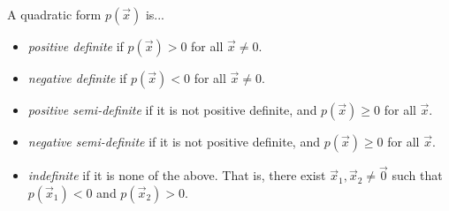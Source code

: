 \documentclass{ximera}
\begin{document}
\begin{definition}
A quadratic form $p(\vec{x})$ is...
\begin{itemize}
\item \emph{positive definite} if $p(\vec{x})>0$ for all $\vec{x}\neq 0$.

\item \emph{negative definite} if $p(\vec{x})<0$ for all $\vec{x}\neq 0$.

\item \emph{positive semi-definite} if it is not positive definite, and $p(\vec{x})\geq 0$ for all $\vec{x}$.

\item \emph{negative semi-definite} if it is not positive definite, and $p(\vec{x})\geq 0$ for all $\vec{x}$.

\item \emph{indefinite} if it is none of the above. That is, there exist $\vec{x}_1,\vec{x}_2\neq \vec{0}$ such that $p(\vec{x}_1) <0$ and $p(\vec{x}_2)>0$. 
\end{itemize}
\end{definition}
\end{document}
